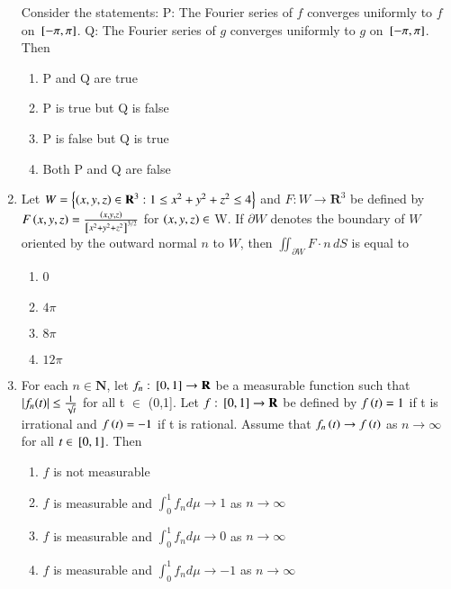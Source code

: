 \documentclass[journal]{IEEEtran}
\numberwithin{equation}{enumi}
\numberwithin{figure}{enumi}
\begin{document}
\begin{enumerate}[start=18]
    Consider the statements:  
    P: The Fourier series of $f$ converges uniformly to $f$ on ${}\left[-\pi, \pi\right]$.  
    Q: The Fourier series of $g$ converges uniformly to $g$ on ${}\left[-\pi, \pi\right]$.  
    Then
    \begin{enumerate}
        \item P and Q are true
        \item P is true but Q is false
        \item P is false but Q is true
        \item Both P and Q are false
    \end{enumerate}
\item Let $W = \left\{\left(x,y,z\right) \in \mathbf{R}^3 : 1 \leq x^2 + y^2 + z^2 \leq 4\right\}$ and $F: W \to \mathbf{R}^3$ be defined by
    $
    F\left(x, y, z\right) = \frac{\left(x, y, z\right)}{{}\left[x^2 + y^2 + z^2\right]^{3/2}}$ for $\left(x, y, z\right) \in$ W.
    If $\partial W$ denotes the boundary of $W$ oriented by the outward normal $n$ to $W$, then
    $
    \iint_{\partial W} F \cdot n \, dS
    $
    is equal to
    \begin{enumerate}
        \item 0
        \item $4\pi$
        \item $8\pi$
        \item $12\pi$
    \end{enumerate}
    \item For each $n \in \mathbf{N}$, let $f_n: {}\left[0,1\right] \to \mathbf{R}$ be a measurable function such that
    $
    \left\vert f_n(t)\right\vert \leq \frac{1}{\sqrt{t}}
    $
    for all t $\in$ (0,1]. Let $f: {}\left[0,1\right] \to \mathbf{R}$ be defined by
    $    f\left(t\right) = 1 $ if t is irrational and $f\left(t\right)=-1$ if t is rational.
    Assume that $f_n\left(t\right) \to f\left(t\right)$ as $n \to \infty$ for all $t \in {}\left[0,1\right]$. Then
    \begin{enumerate}
        \item $f$ is not measurable
        \item $f$ is measurable and $\int_0^1 f_n d\mu \to 1$ as $n \to \infty$
        \item $f$ is measurable and $\int_0^1 f_n d\mu \to 0$ as $n \to \infty$
        \item $f$ is measurable and $\int_0^1 f_n d\mu \to -1$ as $n \to \infty$
    \end{enumerate}
\end{enumerate}
\end{document}
